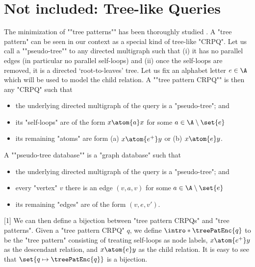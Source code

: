 \section{Not included: Tree-like Queries}

The minimization of ""tree patterns"" has been thoroughly studied \cite{min-tree-patterns}. 
A "tree pattern" can be seen in our context as a special kind of tree-like "CRPQ". Let us call a \AP""pseudo-tree"" to any directed multigraph such that (i) it has no parallel edges (in particular no parallel self-loops) and (ii) once the self-loops are removed, it is a directed `root-to-leaves' tree.
Let us fix an alphabet letter $e \in \A$ which will be used to model the child relation.
A \AP""tree pattern CRPQ"" is then any "CRPQ" such that
\begin{itemize}
  \item the underlying directed multigraph of the query is a "pseudo-tree"; and
  \item its "self-loops" are of the form $x \atom{a} x$ for some $a \in \A \setminus \set{e}$
  \item its remaining "atoms" are form (a) $x \atom{e^+} y$ or (b) $x \atom{e} y$.
\end{itemize}
A \AP""pseudo-tree database"" is a "graph database" such that
\begin{itemize}
  \item the underlying directed multigraph of the query is a "pseudo-tree"; and
  \item every "vertex" $v$ there is an edge $(v,a,v)$ for some $a \in \A \setminus \set{e}$
  \item its remaining "edges" are of the form $(v,e,v')$.
\end{itemize}

\knowledgenewrobustcmd{\treePatEnc}[1]{}
We can then define a bijection between "tree pattern CRPQs" and "tree patterns". Given a "tree pattern CRPQ" $q$, we define $\intro*\treePatEnc{q}$ to be the "tree pattern" consisting of treating self-loops as node labels, $x \atom{e^+} y$ as the descendant relation, and $x \atom{e} y$ as the child relation. It is easy to see that $\set{q \mapsto \treePatEnc{q}}$ is a bijection. 

